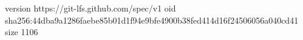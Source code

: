 version https://git-lfs.github.com/spec/v1
oid sha256:44dba9a1286faebe85b01d1f94e9bfe4900b38fed414d16f24506056a040cd41
size 1106
